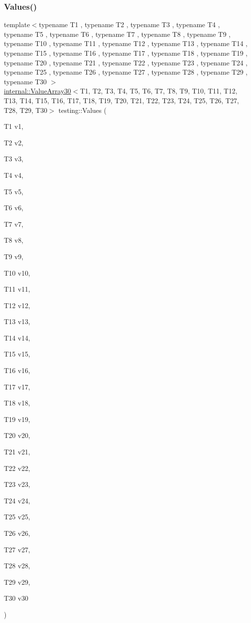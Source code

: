 \mbox{\label{namespacetesting_a016767be70ad0412bdbf837bc4d3ca98}} 
\subsubsection{\texorpdfstring{Values()}{Values()}\hspace{0.1cm}{\footnotesize\ttfamily [31/51]}}
{\footnotesize\ttfamily template$<$typename T1 , typename T2 , typename T3 , typename T4 , typename T5 , typename T6 , typename T7 , typename T8 , typename T9 , typename T10 , typename T11 , typename T12 , typename T13 , typename T14 , typename T15 , typename T16 , typename T17 , typename T18 , typename T19 , typename T20 , typename T21 , typename T22 , typename T23 , typename T24 , typename T25 , typename T26 , typename T27 , typename T28 , typename T29 , typename T30 $>$ \\
\mbox{\hyperlink{classtesting_1_1internal_1_1_value_array30}{internal\+::\+Value\+Array30}}$<$T1, T2, T3, T4, T5, T6, T7, T8, T9, T10, T11, T12, T13, T14, T15, T16, T17, T18, T19, T20, T21, T22, T23, T24, T25, T26, T27, T28, T29, T30$>$ testing\+::\+Values (\begin{DoxyParamCaption}\item[{T1}]{v1,  }\item[{T2}]{v2,  }\item[{T3}]{v3,  }\item[{T4}]{v4,  }\item[{T5}]{v5,  }\item[{T6}]{v6,  }\item[{T7}]{v7,  }\item[{T8}]{v8,  }\item[{T9}]{v9,  }\item[{T10}]{v10,  }\item[{T11}]{v11,  }\item[{T12}]{v12,  }\item[{T13}]{v13,  }\item[{T14}]{v14,  }\item[{T15}]{v15,  }\item[{T16}]{v16,  }\item[{T17}]{v17,  }\item[{T18}]{v18,  }\item[{T19}]{v19,  }\item[{T20}]{v20,  }\item[{T21}]{v21,  }\item[{T22}]{v22,  }\item[{T23}]{v23,  }\item[{T24}]{v24,  }\item[{T25}]{v25,  }\item[{T26}]{v26,  }\item[{T27}]{v27,  }\item[{T28}]{v28,  }\item[{T29}]{v29,  }\item[{T30}]{v30 }\end{DoxyParamCaption})}

